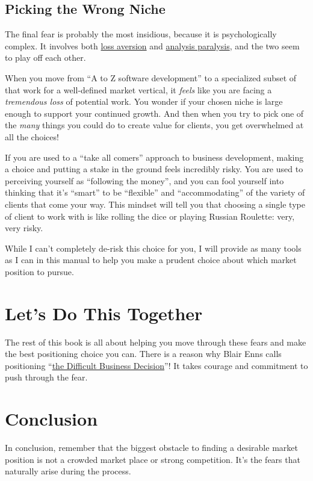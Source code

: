 \subsection{Picking the Wrong Niche}

The final fear is probably the most insidious, because it is psychologically complex. It involves both \href{https://en.wikipedia.org/wiki/Loss_aversion}{loss aversion} and \href{http://en.wikipedia.org/wiki/Analysis_paralysis}{analysis paralysis}, and the two seem to play off each other.

When you move from ``A to Z software development'' to a specialized subset of that work for a well-defined market vertical, it \emph{feels} like you are facing a \emph{tremendous loss} of potential work. You wonder if your chosen niche is large enough to support your continued growth. And then when you try to pick one of the \emph{many} things you could do to create value for clients, you get overwhelmed at all the choices!

If you are used to a ``take all comers'' approach to business development, making a choice and putting a stake in the ground feels incredibly risky. You are used to perceiving yourself as ``following the money'', and you can fool yourself into thinking that it's ``smart'' to be ``flexible'' and ``accommodating'' of the variety of clients that come your way. This mindset will tell you that choosing a single type of client to work with is like rolling the dice or playing Russian Roulette: very, very risky.

While I can't completely de-risk this choice for you, I will provide as many tools as I can in this manual to help you make a prudent choice about which market position to pursue.

\section{Let's Do This Together}

The rest of this book is all about helping you move through these fears and make the best positioning choice you can. There is a reason why Blair Enns calls positioning ``\href{http://www.winwithoutpitching.com/read-it-online/the-purpose-of-positioning/}{the Difficult Business Decision}''! It takes courage and commitment to push through the fear.

\section{Conclusion}

In conclusion, remember that the biggest obstacle to finding a desirable market position is not a crowded market place or strong competition. It’s the fears that naturally arise during the process.
